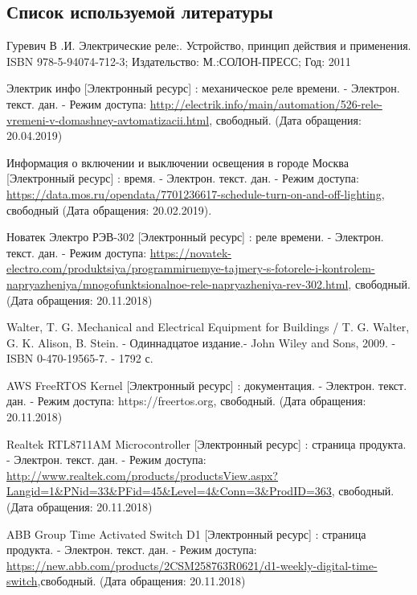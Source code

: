 \subsection{ Список используемой литературы}
\begin{my_enumerate}

\item Гуревич В .И. Электрические реле:. Устройство, принцип действия и применения. ISBN 978-5-94074-712-3; Издательство: М.:СОЛОН-ПРЕСС; Год: 2011

\item Электрик инфо [Электронный ресурс] : механическое реле времени. - Электрон. текст. дан. - Режим доступа: \url{http://electrik.info/main/automation/526-rele-vremeni-v-domashney-avtomatizacii.html}, свободный. (Дата обращения: 20.04.2019)

\item Информация о включении и выключении освещения в городе Москва [Электронный ресурс] : время. - Электрон. текст. дан. - Режим доступа: \url{https://data.mos.ru/opendata/7701236617-schedule-turn-on-and-off-lighting}, свободный (Дата обращения: 20.02.2019). 

\item Новатек Электро РЭВ-302 [Электронный ресурс] : реле времени. - Электрон. текст. дан. - Режим доступа: \url{https://novatek-electro.com/produktsiya/programmiruemye-tajmery-s-fotorele-i-kontrolem-napryazheniya/mnogofunktsionalnoe-rele-napryazheniya-rev-302.html}, свободный. (Дата обращения: 20.11.2018)

\item Walter, T. G. Mechanical and Electrical Equipment for Buildings / T. G. Walter, G. K. Alison, B. Stein. - Одиннадцатое издание.-  John Wiley and Sons, 2009. - ISBN 0-470-19565-7. - 1792 с.

\item AWS FreeRTOS Kernel  [Электронный ресурс] : документация. - Электрон. текст. дан. - Режим доступа: https://freertos.org, свободный. (Дата обращения: 20.11.2018)

\item Realtek RTL8711AM Microcontroller [Электронный ресурс] : страница продукта. - Электрон. текст. дан. - Режим доступа: \url{http://www.realtek.com/products/productsView.aspx?Langid=1&PNid=33&PFid=45&Level=4&Conn=3&ProdID=363}, свободный. (Дата обращения: 20.11.2018)

\item ABB Group Time Activated Switch D1 [Электронный ресурс] : страница продукта. - Электрон. текст. дан. - Режим доступа: \url{https://new.abb.com/products/2CSM258763R0621/d1-weekly-digital-time-switch},свободный. (Дата обращения: 20.11.2018)


\end{my_enumerate}
